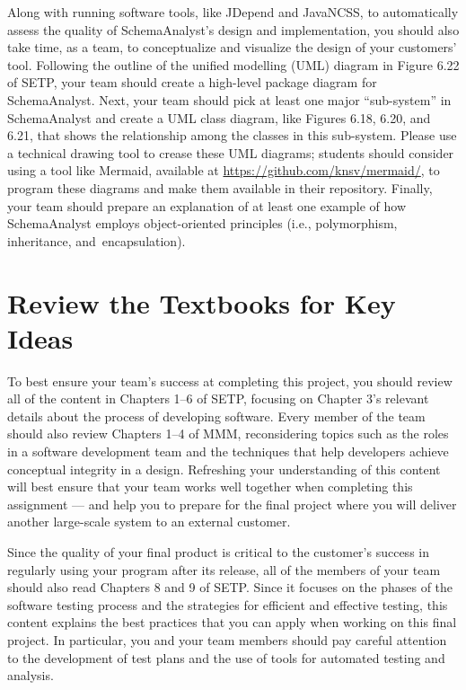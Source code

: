 Along with running software tools, like JDepend and JavaNCSS, to automatically assess the quality of SchemaAnalyst's
design and implementation, you should also take time, as a team, to conceptualize and visualize the design of your
customers' tool. Following the outline of the unified modelling (UML) diagram in Figure 6.22 of SETP, your team should
create a high-level package diagram for SchemaAnalyst. Next, your team should pick at least one major ``sub-system'' in
SchemaAnalyst and create a UML class diagram, like Figures 6.18, 6.20, and 6.21, that shows the relationship among the
classes in this sub-system. Please use a technical drawing tool to crease these UML diagrams; students should consider
using a tool like Mermaid, available at \url{https://github.com/knsv/mermaid/}, to program these diagrams and make them
available in their repository. Finally, your team should prepare an explanation of at least one example of how
SchemaAnalyst employs object-oriented principles (i.e., polymorphism, inheritance, \mbox{and encapsulation)}.

\section*{Review the Textbooks for Key Ideas}

To best ensure your team's success at completing this project, you should review all of the content in Chapters 1--6 of
SETP, focusing on Chapter 3's relevant details about the process of developing software. Every member of the team should
also review Chapters 1--4 of MMM, reconsidering topics such as the roles in a software development team and the
techniques that help developers achieve conceptual integrity in a design. Refreshing your understanding of this content
will best ensure that your team works well together when completing this assignment --- and help you to prepare for the
final project where you will deliver another large-scale system to an external customer.

Since the quality of your final product is critical to the customer's success in regularly using your program after its
release, all of the members of your team should also read Chapters 8 and 9 of SETP. Since it focuses on the phases of
the software testing process and the strategies for efficient and effective testing, this content explains the best
practices that you can apply when working on this final project. In particular, you and your team members should pay
careful attention to the development of test plans and the use of tools for automated testing and analysis.

